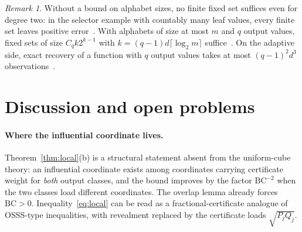 \documentclass[11pt]{article}
\numberwithin{equation}{section}
\theoremstyle{definition}
\theoremstyle{remark}
\newtheorem{remark}[theorem]{Remark}
\newcommand{\1}{\mathbf 1}
\begin{document}
\begin{remark}
Without a bound on alphabet sizes, no finite fixed set suffices even for degree two: in the selector example with countably many leaf values, every finite set leaves positive error~\cite{Wri26,WriAO}. With alphabets of size at most $m$ and $q$ output values, fixed sets of size $C_qk2^{k-1}$ with $k=(q-1)d\lceil\log_2m\rceil$ suffice~\cite{Wri26}. On the adaptive side, exact recovery of a function with $q$ output values takes at most $(q-1)^2d^3$ observations~\cite{Wri26}.
\end{remark}

\section{Discussion and open problems}

\paragraph{Where the influential coordinate lives.}
Theorem~\ref{thm:local}(b) is a structural statement absent from the uniform-cube theory: an influential coordinate exists among coordinates carrying certificate weight for \emph{both} output classes, and the bound improves by the factor $\mathrm{BC}^{-2}$ when the two classes load different coordinates. The overlap lemma already forces $\mathrm{BC}>0$. Inequality~\eqref{eq:local} can be read as a fractional-certificate analogue of OSSS-type inequalities, with revealment replaced by the certificate loads $\sqrt{P_jQ_j}$.
\end{document}
